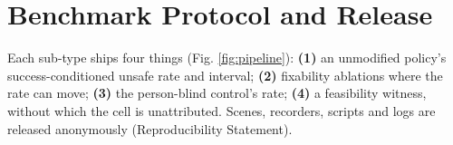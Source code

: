 \section{Benchmark Protocol and Release}


Each sub-type ships four things (Fig. \ref{fig:pipeline}): \textbf{(1)} an unmodified policy's success-conditioned unsafe rate and interval; \textbf{(2)} fixability ablations where the rate can move; \textbf{(3)} the person-blind control's rate; \textbf{(4)} a feasibility witness, without which the cell is unattributed. Scenes, recorders, scripts and logs are released anonymously (Reproducibility Statement).

